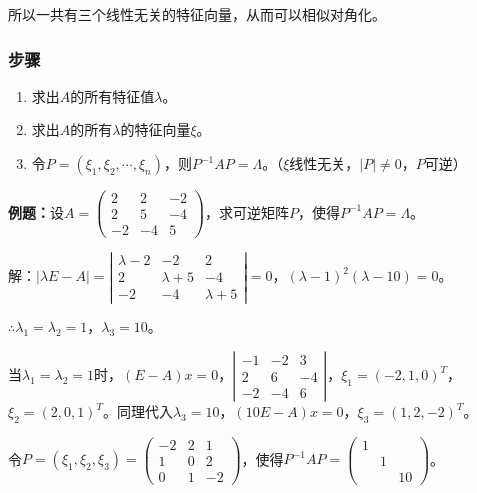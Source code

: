 \documentclass[UTF8, 12pt]{ctexart}
\begin{document}
所以一共有三个线性无关的特征向量，从而可以相似对角化。

\subsubsection{步骤}

\begin{enumerate}
    \item 求出$A$的所有特征值$\lambda$。
    \item 求出$A$的所有$\lambda$的特征向量$\xi$。
    \item 令$P=(\xi_1,\xi_2,\cdots,\xi_n)$，则$P^{-1}AP=\Lambda$。（$\xi$线性无关，$\vert P\vert\neq0$，$P$可逆）
\end{enumerate}

\textbf{例题：}设$A=\left(\begin{array}{ccc}
    2 & 2 & -2 \\
    2 & 5 & -4 \\
    -2 & -4 & 5
\end{array}\right)$，求可逆矩阵$P$，使得$P^{-1}AP=\Lambda$。

解：$\vert\lambda E-A\vert=\left|\begin{array}{ccc}
    \lambda-2 & -2 & 2 \\
    2 & \lambda+5 & -4 \\
    -2 & -4 & \lambda+5
\end{array}\right|=0$，$(\lambda-1)^2(\lambda-10)=0$。

$\therefore\lambda_1=\lambda_2=1$，$\lambda_3=10$。

当$\lambda_1=\lambda_2=1$时，$(E-A)x=0$，$\left|\begin{array}{ccc}
    -1 & -2 & 3 \\
    2 & 6 & -4 \\
    -2 & -4 & 6
\end{array}\right|$，$\xi_1=(-2,1,0)^T$，$\xi_2=(2,0,1)^T$。同理代入$\lambda_3=10$，$(10E-A)x=0$，$\xi_3=(1,2,-2)^T$。

令$P=(\xi_1,\xi_2,\xi_3)=\left(\begin{array}{ccc}
    -2 & 2 & 1 \\
    1 & 0 & 2 \\
    0 & 1 & -2
\end{array}\right)$，使得$P^{-1}AP=\left(\begin{array}{ccc}
    1 \\
     & 1 \\
     & & 10
\end{array}\right)$。
\end{document}
